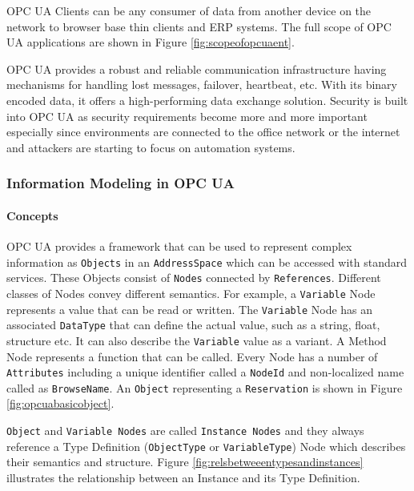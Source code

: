 OPC UA Clients can be any consumer of data from another device on the network to browser base thin clients and ERP systems. The full scope of OPC UA applications are shown in Figure \ref{fig:scopeofopcuaent}.


\FloatBarrier

OPC UA provides a robust and reliable communication infrastructure having mechanisms for handling lost messages, failover, heartbeat, etc. With its binary encoded data, it offers a high-performing data exchange solution. Security is built into OPC UA as security requirements become more and more important especially since environments are connected to the office network or the internet and attackers are starting to focus on automation systems.

\subsubsection{Information Modeling in OPC UA}

\paragraph{Concepts}

OPC UA provides a framework that can be used to represent complex information as \texttt{Objects} in an \texttt{AddressSpace} which can be accessed with standard services. These Objects consist of \texttt{Nodes} connected by \texttt{References}. Different classes of Nodes convey different semantics. For example, a \texttt{Variable} Node represents a value that can be read or written. The \texttt{Variable} Node has an associated \texttt{DataType} that can define the actual value, such as a string, float, structure etc. It can also describe the \texttt{Variable} value as a variant. A Method Node represents a function that can be called. Every Node has a number of \texttt{Attributes} including a unique identifier called a \texttt{NodeId} and non-localized name called as \texttt{BrowseName}. An \texttt{Object} representing a \texttt{Reservation} is shown in Figure \ref{fig:opcuabasicobject}.



\FloatBarrier

\texttt{Object} and \texttt{Variable Nodes} are called \texttt{Instance Nodes} and they always reference a Type Definition (\texttt{ObjectType} or \texttt{VariableType}) Node which describes their semantics and structure. Figure \ref{fig:relsbetweeentypesandinstances} illustrates the relationship between an Instance and its Type Definition.

